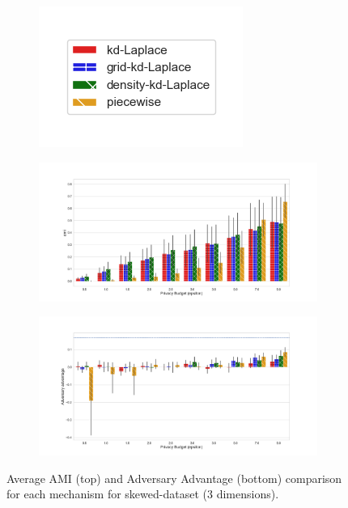 \begin{figure}[H]
  \centering
  \begin{subfigure}{0.30\textwidth}
    \includegraphics[width=\textwidth]{Results/kd-laplace/ami_bar_comparison_legend.png}
  \end{subfigure}
  \begin{subfigure}{1\textwidth}
    \includegraphics[width=1\textwidth]{Results/nd-laplace/ami_skewed-dataset_comparison.png}
  \end{subfigure}
  \begin{subfigure}{1\textwidth}
    \includegraphics[width=1\textwidth]{Results/nd-laplace/attack_adv_skewed-dataset_comparison.png}
  \end{subfigure}
  \caption{Average AMI (top) and Adversary Advantage (bottom) comparison for each mechanism for skewed-dataset (3 dimensions).}
  \label{fig:utility_skewed-dataset_comparison_nd_plot}
\end{figure}
